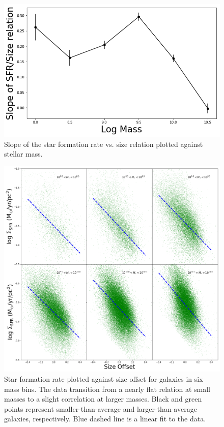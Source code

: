 \documentclass[iop]{emulateapj}
\begin{document}
\begin{figure}
	\centering
	\includegraphics[width= \columnwidth]{slope_sfr_size.png}
	\caption{Slope of the star formation rate vs. size relation plotted against stellar mass.}
	\label{fig:HA_lum_mass}
	
\end{figure}

\begin{figure}
	\centering
	\includegraphics[width=1.5 \columnwidth]{ha_lum_dens_2x2_2A.png}
	\caption{Star formation rate plotted against size offset for galaxies in six mass bins. The data transition from a nearly flat relation at small masses to a slight correlation at larger masses. Black and green points represent smaller-than-average and larger-than-average galaxies, respectively. Blue dashed line is a linear fit to the data.}
	\label{fig:sfrdens}
	
\end{figure}
\end{document}
